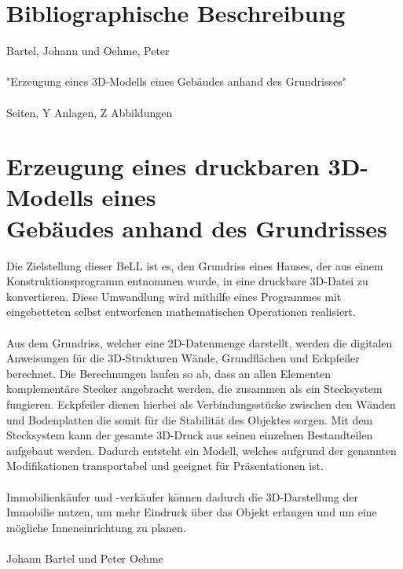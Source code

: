 \section*{Bibliographische Beschreibung}
Bartel, Johann und Oehme, Peter\\\\
"Erzeugung eines 3D-Modells eines Gebäudes anhand des Grundrisses"\\\\
 \pageref{LastPage} Seiten, Y Anlagen, Z Abbildungen
 
  \newpage
 
\section*{Erzeugung eines druckbaren 3D-Modells eines \\ Gebäudes anhand des Grundrisses}
 	
 
 Die Zielstellung dieser BeLL ist es, den Grundriss eines Hauses, der aus einem Konstruktionsprogramm entnommen wurde, in eine druckbare 3D-Datei zu konvertieren.
 Diese Umwandlung wird mithilfe eines Programmes mit eingebetteten selbst entworfenen mathematischen Operationen realisiert.\\\\
 Aus dem Grundriss, welcher eine 2D-Datenmenge darstellt, werden die digitalen Anweisungen für die 3D-Strukturen Wände, Grundflächen und Eckpfeiler berechnet. 
 Die Berechnungen laufen so ab, dass an allen Elementen komplementäre Stecker angebracht werden, die zusammen als ein Stecksystem fungieren. 
 Eckpfeiler dienen hierbei als Verbindungsstücke zwischen den Wänden und Bodenplatten die somit für die Stabilität des Objektes  sorgen. 
 Mit dem Stecksystem kann der gesamte 3D-Druck aus seinen einzelnen Bestandteilen aufgebaut werden. 
 Dadurch entsteht ein Modell, welches aufgrund der genannten Modifikationen transportabel und geeignet für Präsentationen ist.\\\\
 Immobilienkäufer und -verkäufer können dadurch die 3D-Darstellung der Immobilie  nutzen, um mehr Eindruck über das Objekt erlangen und um eine mögliche Inneneinrichtung zu planen.\\\\
 Johann Bartel und Peter Oehme
